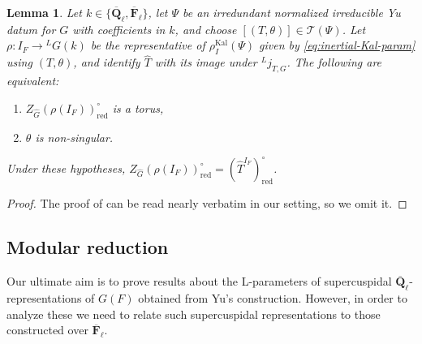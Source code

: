 \documentclass[reqno]{amsart}
\numberwithin{equation}{subsection}
\newcommand{\F}{\mathbf{F}}
\newcommand{\Q}{\mathbf{Q}}
\newcommand{\ol}[1]{\overline{#1}}
\newcommand{\wh}[1]{\widehat{#1}}
\newcommand{\co}{\colon}
\newcommand{\ld}{{}^L}
\newcommand\cO{\mathcal{O}}
\newcommand\cT{\mathcal{T}}
\DeclareMathOperator{\Nm}{Nm}
\DeclareMathOperator{\red}{red}
\DeclareMathOperator{\Kal}{Kal}
\newtheorem{lemma}[thm]{Lemma}
\theoremstyle{remark}
\numberwithin{equation}{subsection}
\numberwithin{figure}{subsection}
\begin{document}
\begin{lemma}\label{lemma:toral-inertial-centralizer-criterion}
Let $k\in\{\ol\Q_\ell,\ol\F_\ell\}$, let $\Psi$ be an irredundant normalized irreducible Yu datum for $G$ with coefficients in $k$, and choose $[(T,\theta)]\in\cT(\Psi)$. Let $\rho\co I_F\to\ld G(k)$ be the representative of $\rho_I^{\Kal}(\Psi)$ given by \eqref{eq:inertial-Kal-param} using $(T,\theta)$, and identify $\wh T$ with its image under $\ld j_{T,G}$.
The following are equivalent:
\begin{enumerate}
\item $Z_{\wh G}(\rho(I_F))^\circ_{\red}$ is a torus,
\item $\theta$ is non-singular.
\end{enumerate}
Under these hypotheses, $Z_{\wh G}(\rho(I_F))^\circ_{\red}=(\wh T^{I_F})^\circ_{\red}$.
\end{lemma}

\begin{proof}
The proof of \cite[Lemma~4.1.10]{Kal21b} can be read nearly verbatim in our setting, so we omit it.
\end{proof}



\subsection{Modular reduction}

Our ultimate aim is to prove results about the L-parameters of supercuspidal $\ol\Q_\ell$-representations of $G(F)$ obtained from Yu's construction. However, in order to analyze these we need to relate such supercuspidal representations to those constructed over $\ol\F_\ell$.
\end{document}
